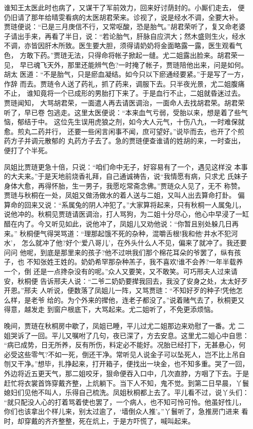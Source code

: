 谁知王太医此时也病了，又谋干了军前效力，回来好讨荫封的。小厮们走去，
便仍旧请了那年给晴雯看病的太医胡君荣来。诊视了，说是经水不调，全要大补。
贾琏便说：“已是三月庚信不行，又常呕酸，恐是胎气。”胡君荣听了，复又命老婆
子请出手来，再看了半日，说：“若论胎气，肝脉自应洪大；然木盛则生火，经水
不调，亦皆因肝木所致。医生要大胆，须得请奶奶将金面略露一露，医生观看气色，
方敢下药。”贾琏无法，只得命将帐子掀起一缝。尤二姐露出脸来。胡君荣一见，
早已魂飞天外，那里还能辨气色?一时掩了帐子，贾琏陪他出来，问是如何。胡太
医道：“不是胎气，只是瘀血凝结。如今只以下瘀通经要紧。”于是写了一方，作辞
而去。贾琏令人送了药礼，抓了药来，调服下去。只半夜光景，尤二姐腹痛不止，
谁知竟将一个已成形的男胎打下来了。于是血行不止，二姐就昏迷过去。贾琏闻知，
大骂胡君荣，一面遣人再去请医调治，一面命人去找胡君荣。胡君荣听了，早已卷
包逃走。这里太医便说：“本来血气亏弱，受胎以来，想是着了些气恼，郁结于中。
这位先生误用虎狼之剂，如今大人元气，十伤八九，一时难保就愈。煎丸二药并行，
还要一些闲言闲事不闻，庶可望好。”说毕而去，也开了个煎药方子并调元散郁的
丸药方子去了。急的贾琏便查谁请的姓胡的来，一时查出，便打了个半死。

凤姐比贾琏更急十倍，只说：“咱们命中无子，好容易有了一个，遇见这样没
本事的大夫来。”于是天地前烧香礼拜，自己通诚祷告，说“我情愿有病，只求尤
氏妹子身体大愈，再得怀胎，生一男子，我愿吃常斋念佛。”贾琏众人见了，无不
称赞。贾琏与秋桐在一处，凤姐又做汤做水的着人送与二姐，又叫人出去算命打卦。
偏算命的回来又说：“系属兔的阴人冲犯了。”大家算将起来，只有秋桐一人属兔儿，
说他冲的。秋桐见贾琏请医调治，打人骂狗，为二姐十分尽心，他心中早浸了一缸
醋在内了。今又听见如此，说他冲了，凤姐儿又劝他说：“你暂且别处躲几日再来。”
秋桐便气得哭骂道：“理那起饿不死的杂种，混嚼舌根!我和他‘井水不犯河水’，
怎么就冲了他?好个‘爱八哥儿’，在外头什么人不见，偏来了就冲了。我还要问问
他呢，到底是那里来的孩子?他不过哄我们那个棉花耳朵的爷罢了，纵有孩子，也
不知张姓王姓的。奶奶希罕那杂种羔子，我不喜欢!谁不会养?一年半载养一个，倒
还是一点搀杂没有的呢。”众人又要笑，又不敢笑。可巧邢夫人过来请安，秋桐便
告诉邢夫人说：“二爷二奶奶要撵我回去，我没了安身之处，太太好歹开恩。”邢夫
人听说，便数落了凤姐儿一阵，又骂贾琏：“不知好歹的种子!凭他怎么样，是老爷
给的。为个外来的撵他，连老子都没了。”说着赌气去了，秋桐更又得意，越发走
到窗户根底下，大骂起来。尤二姐听了，不免更添烦恼。

晚间，贾琏在秋桐房中歇了，凤姐已睡，平儿过尤二姐那边来劝慰了一番。尤
二姐哭诉了一回。平儿又嘱咐了几句，夜已深了，方去安息。这里尤二姐心中自思：
“病已成势，日无所养，反有所伤，料定必不能好。况胎已经打下，无甚悬心，何
必受这些零气?不如一死，倒还干净。常听见人说金子可以坠死人，岂不比上吊自
刎又干净。”想毕，扎挣起来，打开箱子，便找出一块金，也不知多重。哭了一回，
外边将近五更天气，那二姐咬牙，狠命便吞入口中，几次直脖，方咽了下去。于是
赶忙将衣裳首饰穿戴齐整，上炕躺下。当下人不知，鬼不觉。到第二日早晨，丫鬟
媳妇们见他不叫人，乐得自己梳洗。凤姐秋桐都上去了。平儿看不过，说丫头们：
“就只配没人心的打着骂着使也罢了，一个病人，也不知可怜可怜。他虽好性儿，
你们也该拿出个样儿来，别太过逾了，‘墙倒众人推’。”丫鬟听了，急推房门进来
看时，却穿戴的齐齐整整，死在炕上，于是方吓慌了，喊叫起来。

